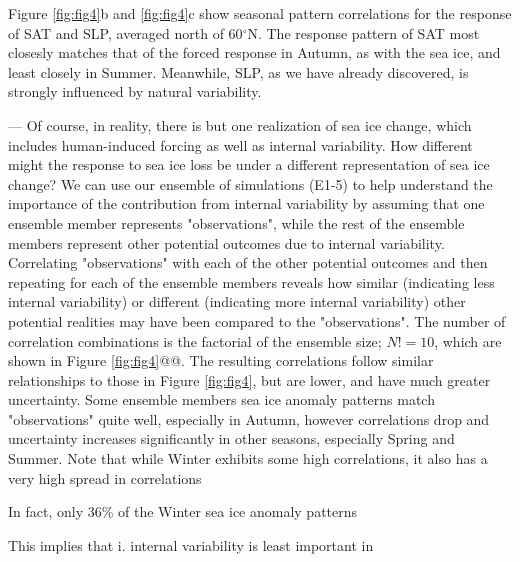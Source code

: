 \documentclass[twocol]{ametsoc}
\begin{document}
Figure \ref{fig:fig4}b and \ref{fig:fig4}c show seasonal pattern correlations for the response of SAT and SLP, averaged north of 60$^\circ$N. The response pattern of SAT most closesly matches that of the forced response in Autumn, as with the sea ice, and least closely in Summer. Meanwhile, SLP, as we have already discovered, is strongly influenced by natural variability. 

---
Of course, in reality, there is but one realization of sea ice change, which includes human-induced forcing as well as internal variability. How different might the response to sea ice loss be under a different representation of sea ice change? We can use our ensemble of simulations (E1-5) to help understand the importance of the contribution from internal variability by assuming that one ensemble member represents "observations", while the rest of the ensemble members represent other potential outcomes due to internal variability. Correlating "observations" with each of the other potential outcomes and then repeating for each of the ensemble members reveals how similar (indicating less internal variability) or different (indicating more internal variability) other potential realities may have been compared to the "observations".  The number of correlation combinations is the factorial of the ensemble size; $N! = 10$, which are shown in Figure \ref{fig:fig4}@@. The resulting correlations follow similar relationships to those in Figure \ref{fig:fig4}, but are lower, and have much greater uncertainty. Some ensemble members sea ice anomaly patterns match "observations" quite well, especially in Autumn, however correlations drop and uncertainty increases significantly in other seasons, especially Spring and Summer. Note that while Winter exhibits some high correlations, it also has a very high spread in correlations

In fact, only 36\% of the Winter sea ice anomaly patterns 

This implies that i. internal variability is least important in 
\end{document}
